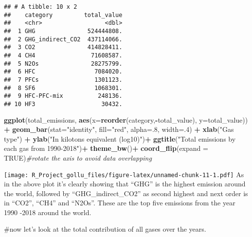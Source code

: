 \documentclass[
]{article}
\newenvironment{Shaded}{\begin{snugshade}}{\end{snugshade}}
\newcommand{\CommentTok}[1]{\textcolor[rgb]{0.56,0.35,0.01}{\textit{#1}}}
\newcommand{\DataTypeTok}[1]{\textcolor[rgb]{0.13,0.29,0.53}{#1}}
\newcommand{\DecValTok}[1]{\textcolor[rgb]{0.00,0.00,0.81}{#1}}
\newcommand{\KeywordTok}[1]{\textcolor[rgb]{0.13,0.29,0.53}{\textbf{#1}}}
\newcommand{\NormalTok}[1]{#1}
\newcommand{\OperatorTok}[1]{\textcolor[rgb]{0.81,0.36,0.00}{\textbf{#1}}}
\newcommand{\OtherTok}[1]{\textcolor[rgb]{0.56,0.35,0.01}{#1}}
\newcommand{\StringTok}[1]{\textcolor[rgb]{0.31,0.60,0.02}{#1}}
\begin{document}
\begin{verbatim}
## # A tibble: 10 x 2
##    category         total_value
##    <chr>                  <dbl>
##  1 GHG               524444808.
##  2 GHG_indirect_CO2  437114066.
##  3 CO2               414828411.
##  4 CH4                71608587.
##  5 N2Os               28275799.
##  6 HFC                 7084020.
##  7 PFCs                1301123.
##  8 SF6                 1068301.
##  9 HFC-PFC-mix          248136.
## 10 HF3                   30432.
\end{verbatim}

\begin{Shaded}
\begin{Highlighting}[]
\KeywordTok{ggplot}\NormalTok{(total_emissions, }\KeywordTok{aes}\NormalTok{(}\DataTypeTok{x=}\KeywordTok{reorder}\NormalTok{(category,}\OperatorTok{-}\NormalTok{total_value), }\DataTypeTok{y=}\NormalTok{total_value)) }\OperatorTok{+}
\StringTok{    }\KeywordTok{geom_bar}\NormalTok{(}\DataTypeTok{stat=}\StringTok{"identity"}\NormalTok{, }\DataTypeTok{fill=}\StringTok{"red"}\NormalTok{, }\DataTypeTok{alpha=}\NormalTok{.}\DecValTok{8}\NormalTok{, }\DataTypeTok{width=}\NormalTok{.}\DecValTok{4}\NormalTok{) }\OperatorTok{+}
\StringTok{    }\KeywordTok{xlab}\NormalTok{(}\StringTok{"Gas type"}\NormalTok{) }\OperatorTok{+}
\StringTok{    }\KeywordTok{ylab}\NormalTok{(}\StringTok{"In kilotons equivalent (log10)"}\NormalTok{)}\OperatorTok{+}
\StringTok{    }\KeywordTok{ggtitle}\NormalTok{(}\StringTok{"Total emissions by each gas from 1990-2018"}\NormalTok{)}\OperatorTok{+}
\StringTok{    }\KeywordTok{theme_bw}\NormalTok{()}\OperatorTok{+}
\StringTok{  }\KeywordTok{coord_flip}\NormalTok{(}\DataTypeTok{expand =} \OtherTok{TRUE}\NormalTok{)}\CommentTok{#rotate the axis to avoid data overlapping}
\end{Highlighting}
\end{Shaded}

\texttt{[image: R\_Project\_gollu\_files/figure-latex/unnamed-chunk-11-1.pdf]}
As in the above plot it's clearly showing that ``GHG'' is the highest
emission around the world, followed by ``GHG\_indirect\_CO2'' as second
highest and next order is in ``CO2'', ``CH4'' and ``N2Os''. These are
the top five emissions from the year 1990 -2018 around the world.

\#now let's look at the total contribution of all gases over the years.
\end{document}
